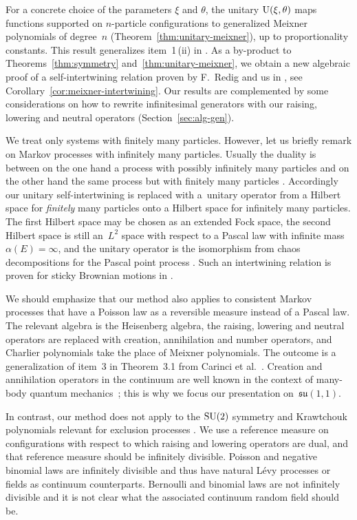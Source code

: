 \documentclass[pdftex]{sigma}
\numberwithin{equation}{section}
\newcommand{\1}{\mathbbm{1}}
\begin{document}
For a concrete choice of the parameters $\xi$ and $\theta$, the unitary ${\rm U}(\xi,\theta)$ maps functions supported on $n$-particle configurations to generalized Meixner polynomials of degree~$n$ (Theorem~\ref{thm:unitary-meixner}), up to proportionality constants. This result generalizes item~1\,(ii) in \cite[Theorem~3.1]{carinci2019orthogonal}.
As a by-product to Theorems~\ref{thm:symmetry} and~\ref{thm:unitary-meixner}, we obtain a new algebraic proof of a self-intertwining relation proven by F.~Redig and us in \cite{IntertwiningConsistent}, see Corollary~\ref{cor:meixner-intertwining}. Our results are complemented by some considerations on how to rewrite infinitesimal generators with our raising, lowering and neutral operators (Section~\ref{sec:alg-gen}).

We treat only systems with finitely many particles. However, let us briefly remark on Markov processes with infinitely many particles. Usually the duality is between on the one hand a process with possibly infinitely many particles and on the other hand the same process but with finitely many particles \cite[Section~III.4]{liggett_interacting_2005}. Accordingly our unitary self-intertwining is replaced with a~unitary operator from a Hilbert space for \emph{finitely} many particles onto a Hilbert space for infinitely many particles. The first Hilbert space may be chosen as an extended Fock space, the second Hilbert space is still an~$L^2$ space with respect to a Pascal law with infinite mass $\alpha(E) = \infty$, and the unitary operator is the isomorphism from chaos decompositions for the Pascal point process \cite[Corollary~5.3]{Lytvynov2003}. Such an intertwining relation is proven for sticky Brownian motions in \cite[Theorem~3.5]{wagner2023infinitely-many}.

We should emphasize that our method also applies to consistent Markov processes that have a Poisson law as a reversible measure instead of a Pascal law. The relevant algebra is the Heisenberg algebra, the raising, lowering and neutral operators are replaced with creation, annihilation and number operators, and Charlier polynomials take the place of Meixner polynomials. The outcome is a generalization of item~3 in Theorem~3.1 from Carinci et al.~\cite{carinci2019orthogonal}. Creation and annihilation operators in the continuum are well known in the context of many-body quantum mechanics~\cite{reedSimonII}; this is why we focus our presentation on~$\mathfrak{su}(1,1)$.

In contrast, our method does not apply to the ${\rm SU}(2)$ symmetry and Krawtchouk polynomials relevant for exclusion processes \cite{carinci2019orthogonal}. We use a reference measure on configurations with respect to which raising and lowering operators are dual, and that reference measure should be infinitely divisible. Poisson and negative binomial laws are infinitely divisible and thus have natural L{\'e}vy processes or fields as continuum counterparts. Bernoulli and binomial laws are not infinitely divisible and it is not clear what the associated continuum random field should be.
\end{document}
